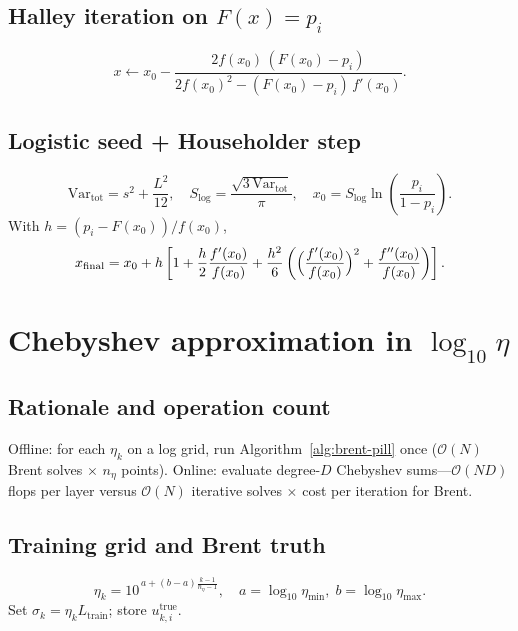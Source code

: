 \documentclass[11pt,a4paper]{article}
\begin{document}
\subsection{\texorpdfstring{Halley iteration on $F(x)=p_i$}{Halley iteration on F(x) equals p}}
\begin{equation}
  x \leftarrow x_0 - \frac{2 f(x_0)\,(F(x_0)-p_i)}{2 f(x_0)^2 - (F(x_0)-p_i)\,f'(x_0)}.
\end{equation}

\subsection{Logistic seed + Householder step}
\begin{equation}
  \mathrm{Var}_{\mathrm{tot}} = s^2 + \frac{L^2}{12},\quad
  S_{\log} = \frac{\sqrt{3\,\mathrm{Var}_{\mathrm{tot}}}}{\pi},\quad
  x_0 = S_{\log}\ln\!\left(\frac{p_i}{1-p_i}\right).
\end{equation}
With $h=(p_i-F(x_0))/f(x_0)$,
\begin{equation}
  x_{\mathrm{final}} = x_0 + h\left[1 + \frac{h}{2}\frac{f'(x_0)}{f(x_0)} + \frac{h^2}{6}\left(\Bigl(\frac{f'(x_0)}{f(x_0)}\Bigr)^2 + \frac{f''(x_0)}{f(x_0)}\right)\right].
\end{equation}

\section{Chebyshev approximation in \texorpdfstring{$\log_{10}\eta$}{log10 eta}}
\label{sec:chebyshev-impl}

\subsection{Rationale and operation count}
Offline: for each $\eta_k$ on a log grid, run Algorithm~\ref{alg:brent-pill} once ($\mathcal{O}(N)$ Brent solves $\times$ $n_\eta$ points).
Online: evaluate degree-$D$ Chebyshev sums---$\mathcal{O}(ND)$ flops per layer versus $\mathcal{O}(N)$ iterative solves $\times$ cost per iteration for Brent.

\subsection{Training grid and Brent truth}
\begin{equation}
  \eta_k = 10^{\,a + (b-a)\frac{k-1}{n_\eta-1}},\quad
  a=\log_{10}\eta_{\min},\; b=\log_{10}\eta_{\max}.
\end{equation}
Set $\sigma_k=\eta_k L_{\mathrm{train}}$; store $u^{\mathrm{true}}_{k,i}$.
\end{document}
